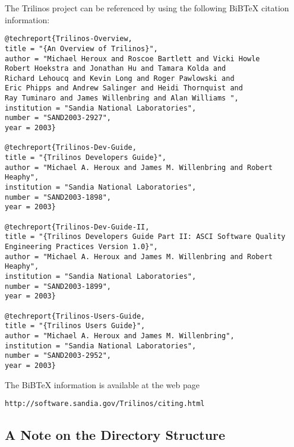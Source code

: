The Trilinos project can be referenced by using the following BiBTeX
citation information:
\begin{verbatim}
@techreport{Trilinos-Overview,
title = "{An Overview of Trilinos}",
author = "Michael Heroux and Roscoe Bartlett and Vicki Howle
Robert Hoekstra and Jonathan Hu and Tamara Kolda and
Richard Lehoucq and Kevin Long and Roger Pawlowski and
Eric Phipps and Andrew Salinger and Heidi Thornquist and
Ray Tuminaro and James Willenbring and Alan Williams ",
institution = "Sandia National Laboratories",
number = "SAND2003-2927",
year = 2003}

@techreport{Trilinos-Dev-Guide,
title = "{Trilinos Developers Guide}",
author = "Michael A. Heroux and James M. Willenbring and Robert Heaphy",
institution = "Sandia National Laboratories",
number = "SAND2003-1898",
year = 2003}

@techreport{Trilinos-Dev-Guide-II,
title = "{Trilinos Developers Guide Part II: ASCI Software Quality
Engineering Practices Version 1.0}",
author = "Michael A. Heroux and James M. Willenbring and Robert Heaphy",
institution = "Sandia National Laboratories",
number = "SAND2003-1899",
year = 2003}

@techreport{Trilinos-Users-Guide,
title = "{Trilinos Users Guide}",
author = "Michael A. Heroux and James M. Willenbring",
institution = "Sandia National Laboratories",
number = "SAND2003-2952",
year = 2003}
\end{verbatim}
The BiBTeX information is available at the web page
\begin{verbatim}
http://software.sandia.gov/Trilinos/citing.html
\end{verbatim}


\subsection{A Note on the Directory Structure}
\label{sec:into_note}

